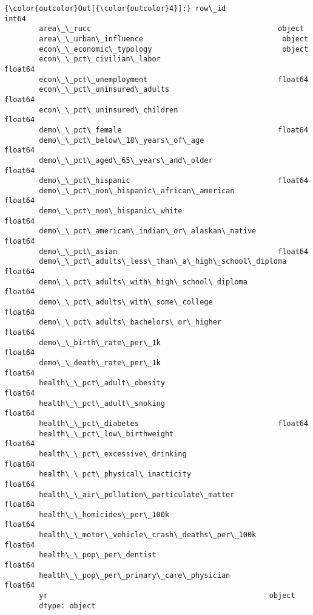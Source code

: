 \documentclass[11pt]{article}
\begin{document}
\begin{Verbatim}[commandchars=\\\{\}]
{\color{outcolor}Out[{\color{outcolor}4}]:} row\_id                                                int64
        area\_\_rucc                                           object
        area\_\_urban\_influence                                object
        econ\_\_economic\_typology                              object
        econ\_\_pct\_civilian\_labor                            float64
        econ\_\_pct\_unemployment                              float64
        econ\_\_pct\_uninsured\_adults                          float64
        econ\_\_pct\_uninsured\_children                        float64
        demo\_\_pct\_female                                    float64
        demo\_\_pct\_below\_18\_years\_of\_age                     float64
        demo\_\_pct\_aged\_65\_years\_and\_older                   float64
        demo\_\_pct\_hispanic                                  float64
        demo\_\_pct\_non\_hispanic\_african\_american             float64
        demo\_\_pct\_non\_hispanic\_white                        float64
        demo\_\_pct\_american\_indian\_or\_alaskan\_native         float64
        demo\_\_pct\_asian                                     float64
        demo\_\_pct\_adults\_less\_than\_a\_high\_school\_diploma    float64
        demo\_\_pct\_adults\_with\_high\_school\_diploma           float64
        demo\_\_pct\_adults\_with\_some\_college                  float64
        demo\_\_pct\_adults\_bachelors\_or\_higher                float64
        demo\_\_birth\_rate\_per\_1k                             float64
        demo\_\_death\_rate\_per\_1k                             float64
        health\_\_pct\_adult\_obesity                           float64
        health\_\_pct\_adult\_smoking                           float64
        health\_\_pct\_diabetes                                float64
        health\_\_pct\_low\_birthweight                         float64
        health\_\_pct\_excessive\_drinking                      float64
        health\_\_pct\_physical\_inacticity                     float64
        health\_\_air\_pollution\_particulate\_matter            float64
        health\_\_homicides\_per\_100k                          float64
        health\_\_motor\_vehicle\_crash\_deaths\_per\_100k         float64
        health\_\_pop\_per\_dentist                             float64
        health\_\_pop\_per\_primary\_care\_physician              float64
        yr                                                   object
        dtype: object
\end{Verbatim}
            
\end{document}
